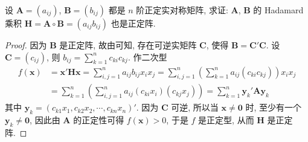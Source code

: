 \documentclass[../../main.tex]{subfiles}%
\begin{document}
\begin{proposition}\label{proposition:正定实对称阵的Hadamard积也正定}
设 \(\boldsymbol{A}=(a_{ij})\), \(\boldsymbol{B}=(b_{ij})\) 都是 \(n\) 阶正定实对称矩阵, 求证: \(\boldsymbol{A}\), \(\boldsymbol{B}\) 的 Hadamard 乘积 \(\boldsymbol{H}=\boldsymbol{A}\circ\boldsymbol{B}=(a_{ij}b_{ij})\) 也是正定阵.
\end{proposition}
\begin{proof}

因为 \(\boldsymbol{B}\) 是正定阵, 故由可知, 存在可逆实矩阵 \(\boldsymbol{C}\), 使得 \(\boldsymbol{B}=\boldsymbol{C}'\boldsymbol{C}\). 设 \(\boldsymbol{C}=(c_{ij})\), 则 \(b_{ij}=\sum_{k = 1}^{n}c_{ki}c_{kj}\). 作二次型
\begin{align*}
f(\boldsymbol{x})&=\boldsymbol{x}'\boldsymbol{H}\boldsymbol{x}=\sum_{i,j = 1}^{n}a_{ij}b_{ij}x_ix_j=\sum_{i,j = 1}^{n}\left(\sum_{k = 1}^{n}a_{ij}(c_{ki}c_{kj})\right)x_ix_j\\
&=\sum_{k = 1}^{n}\left(\sum_{i,j = 1}^{n}a_{ij}(c_{ki}x_i)(c_{kj}x_j)\right)=\sum_{k = 1}^{n}\boldsymbol{y}_k'\boldsymbol{A}\boldsymbol{y}_k
\end{align*}
其中 \(\boldsymbol{y}_k=(c_{k1}x_1,c_{k2}x_2,\cdots,c_{kn}x_n)'\). 因为 \(\boldsymbol{C}\) 可逆, 所以当 \(\boldsymbol{x}\neq\boldsymbol{0}\) 时, 至少有一个 \(\boldsymbol{y}_k\neq\boldsymbol{0}\), 因此由 \(\boldsymbol{A}\) 的正定性可得 \(f(\boldsymbol{x})>0\), 于是 \(f\) 是正定型, 从而 \(\boldsymbol{H}\) 是正定阵.

\end{proof}
\end{document}
